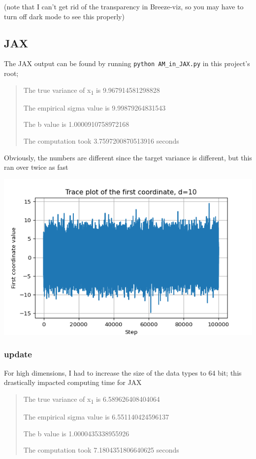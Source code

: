 \documentclass[letterpaper]{article}
\begin{document}
(note that I can't get rid of the transparency in Breeze-viz, so you may have to turn off dark mode to see this properly)
\subsection{JAX}
\label{sec:org1c5253e}

The JAX output can be found by running \texttt{python AM\_in\_JAX.py} in this project's root;

\begin{quote}
The true variance of x\textsubscript{1} is 9.967914581298828

The empirical sigma value is 9.99879264831543

The b value is 1.0000910758972168

The computation took 3.7597200870513916 seconds
\end{quote}

Obviously, the numbers are different since the target variance is different, but this ran over twice as fast

\begin{center}
\includegraphics[width=.9\linewidth]{./Figures/adaptive_trace_JAX.png}
\end{center}
\subsubsection{update}
\label{sec:orgc070832}

For high dimensions, I had to increase the size of the data types to 64 bit; this drastically impacted computing time for JAX

\begin{quote}
The true variance of x\textsubscript{1} is 6.589626408404064

The empirical sigma value is 6.551140424596137

The b value is 1.0000435338955926

The computation took 7.1804351806640625 seconds
\end{quote}
\end{document}
